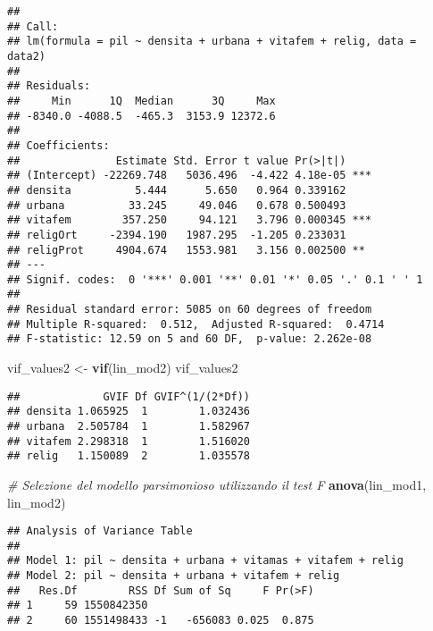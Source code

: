 \documentclass[
]{article}
\newenvironment{Shaded}{\begin{snugshade}}{\end{snugshade}}
\newcommand{\CommentTok}[1]{\textcolor[rgb]{0.56,0.35,0.01}{\textit{#1}}}
\newcommand{\FunctionTok}[1]{\textcolor[rgb]{0.13,0.29,0.53}{\textbf{#1}}}
\newcommand{\NormalTok}[1]{#1}
\newcommand{\OtherTok}[1]{\textcolor[rgb]{0.56,0.35,0.01}{#1}}
\begin{document}
\begin{verbatim}
## 
## Call:
## lm(formula = pil ~ densita + urbana + vitafem + relig, data = data2)
## 
## Residuals:
##     Min      1Q  Median      3Q     Max 
## -8340.0 -4088.5  -465.3  3153.9 12372.6 
## 
## Coefficients:
##               Estimate Std. Error t value Pr(>|t|)    
## (Intercept) -22269.748   5036.496  -4.422 4.18e-05 ***
## densita          5.444      5.650   0.964 0.339162    
## urbana          33.245     49.046   0.678 0.500493    
## vitafem        357.250     94.121   3.796 0.000345 ***
## religOrt     -2394.190   1987.295  -1.205 0.233031    
## religProt     4904.674   1553.981   3.156 0.002500 ** 
## ---
## Signif. codes:  0 '***' 0.001 '**' 0.01 '*' 0.05 '.' 0.1 ' ' 1
## 
## Residual standard error: 5085 on 60 degrees of freedom
## Multiple R-squared:  0.512,  Adjusted R-squared:  0.4714 
## F-statistic: 12.59 on 5 and 60 DF,  p-value: 2.262e-08
\end{verbatim}

\begin{Shaded}
\begin{Highlighting}[]
\NormalTok{vif\_values2 }\OtherTok{\textless{}{-}} \FunctionTok{vif}\NormalTok{(lin\_mod2)}
\NormalTok{vif\_values2}
\end{Highlighting}
\end{Shaded}

\begin{verbatim}
##             GVIF Df GVIF^(1/(2*Df))
## densita 1.065925  1        1.032436
## urbana  2.505784  1        1.582967
## vitafem 2.298318  1        1.516020
## relig   1.150089  2        1.035578
\end{verbatim}

\begin{Shaded}
\begin{Highlighting}[]
\CommentTok{\# Selezione del modello parsimonioso utilizzando il test F}
\FunctionTok{anova}\NormalTok{(lin\_mod1, lin\_mod2)}
\end{Highlighting}
\end{Shaded}

\begin{verbatim}
## Analysis of Variance Table
## 
## Model 1: pil ~ densita + urbana + vitamas + vitafem + relig
## Model 2: pil ~ densita + urbana + vitafem + relig
##   Res.Df        RSS Df Sum of Sq     F Pr(>F)
## 1     59 1550842350                          
## 2     60 1551498433 -1   -656083 0.025  0.875
\end{verbatim}
\end{document}
